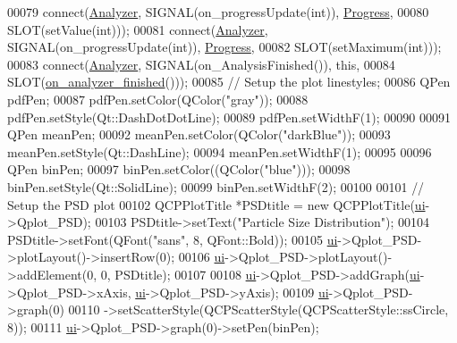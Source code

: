 \begin{DoxyCode}
00079   connect(\hyperlink{class_v_s_a_main_window_a15db0a815b5c9abb5b8ea1bae21e17c9}{Analyzer}, SIGNAL(on\_progressUpdate(\textcolor{keywordtype}{int})), \hyperlink{class_v_s_a_main_window_af5c6186795a53ecfe3efffc95b6619dd}{Progress},
00080           SLOT(setValue(\textcolor{keywordtype}{int})));
00081   connect(\hyperlink{class_v_s_a_main_window_a15db0a815b5c9abb5b8ea1bae21e17c9}{Analyzer}, SIGNAL(on\_progressUpdate(\textcolor{keywordtype}{int})), \hyperlink{class_v_s_a_main_window_af5c6186795a53ecfe3efffc95b6619dd}{Progress},
00082           SLOT(setMaximum(\textcolor{keywordtype}{int})));
00083   connect(\hyperlink{class_v_s_a_main_window_a15db0a815b5c9abb5b8ea1bae21e17c9}{Analyzer}, SIGNAL(on\_AnalysisFinished()), \textcolor{keyword}{this},
00084           SLOT(\hyperlink{class_v_s_a_main_window_a33a4896e2b25348d5e1344e4b37bbd33}{on\_analyzer\_finished}()));
00085   \textcolor{comment}{// Setup the plot linestyles;}
00086   QPen pdfPen;
00087   pdfPen.setColor(QColor(\textcolor{stringliteral}{"gray"}));
00088   pdfPen.setStyle(Qt::DashDotDotLine);
00089   pdfPen.setWidthF(1);
00090 
00091   QPen meanPen;
00092   meanPen.setColor(QColor(\textcolor{stringliteral}{"darkBlue"}));
00093   meanPen.setStyle(Qt::DashLine);
00094   meanPen.setWidthF(1);
00095 
00096   QPen binPen;
00097   binPen.setColor((QColor(\textcolor{stringliteral}{"blue"})));
00098   binPen.setStyle(Qt::SolidLine);
00099   binPen.setWidthF(2);
00100 
00101   \textcolor{comment}{// Setup the PSD plot}
00102   QCPPlotTitle *PSDtitle = \textcolor{keyword}{new} QCPPlotTitle(\hyperlink{class_v_s_a_main_window_a958a0581d2bf1bfe020c3b5d8f738640}{ui}->Qplot\_PSD);
00103   PSDtitle->setText(\textcolor{stringliteral}{"Particle Size Distribution"});
00104   PSDtitle->setFont(QFont(\textcolor{stringliteral}{"sans"}, 8, QFont::Bold));
00105   \hyperlink{class_v_s_a_main_window_a958a0581d2bf1bfe020c3b5d8f738640}{ui}->Qplot\_PSD->plotLayout()->insertRow(0);
00106   \hyperlink{class_v_s_a_main_window_a958a0581d2bf1bfe020c3b5d8f738640}{ui}->Qplot\_PSD->plotLayout()->addElement(0, 0, PSDtitle);
00107 
00108   \hyperlink{class_v_s_a_main_window_a958a0581d2bf1bfe020c3b5d8f738640}{ui}->Qplot\_PSD->addGraph(\hyperlink{class_v_s_a_main_window_a958a0581d2bf1bfe020c3b5d8f738640}{ui}->Qplot\_PSD->xAxis, \hyperlink{class_v_s_a_main_window_a958a0581d2bf1bfe020c3b5d8f738640}{ui}->Qplot\_PSD->yAxis);
00109   \hyperlink{class_v_s_a_main_window_a958a0581d2bf1bfe020c3b5d8f738640}{ui}->Qplot\_PSD->graph(0)
00110       ->setScatterStyle(QCPScatterStyle(QCPScatterStyle::ssCircle, 8));
00111   \hyperlink{class_v_s_a_main_window_a958a0581d2bf1bfe020c3b5d8f738640}{ui}->Qplot\_PSD->graph(0)->setPen(binPen);

\end{DoxyCode}
